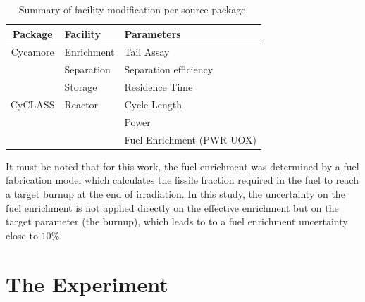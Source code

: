 \documentclass{anstrans}
\begin{document}
\begin{table}[htb]
\centering
  \caption{Summary of facility modification per source package.}
\begin{tabular}{cll}
\toprule

Package   & Facility   & Parameters                \\
\midrule
Cycamore & Enrichment & Tail Assay                \\
         & Separation & Separation efficiency     \\
         & Storage    & Residence Time            \\
\midrule
CyCLASS  & Reactor    & Cycle Length              \\
         &            & Power                     \\
         &            & Fuel Enrichment (PWR-UOX) \\

\bottomrule
\end{tabular}

  \label{tab:package_uncertainty}
\end{table}

It must be noted that for this work, the fuel enrichment was determined by a
fuel fabrication model\cite{leniau} which
calculates the fissile fraction required in the fuel to reach a target
burnup at the end of irradiation. In this study, the uncertainty on the fuel
enrichment is not applied directly on the effective enrichment but on the target
parameter (the burnup), which leads to to a fuel enrichment uncertainty close to
$10\%$.



\section{The Experiment}
\end{document}
